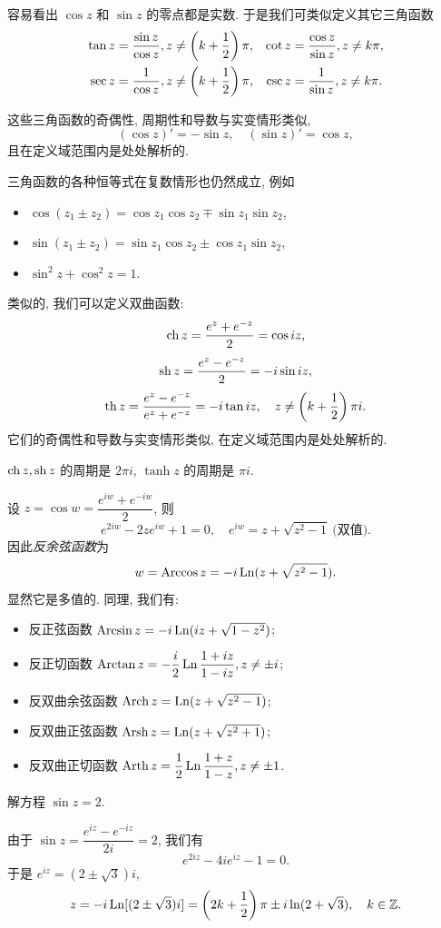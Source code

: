 \documentclass[nocolor,theme=doremi,lang=cn,11pt,chinese,twoside,openright,usesamecnt]{elegantbook}
\begin{document}
容易看出 $\cos z$ 和 $\sin z$ 的零点都是实数.
于是我们可类似定义其它三角函数
\begin{align*}
	\tan z&=\frac{\sin z}{\cos z},z\neq\left(k+\frac{1}{2}\right)\pi,&
	\cot z&=\frac{\cos z}{\sin z},z\neq k\pi,\\
	\sec z&=\frac{1}{\cos z},z\neq\left(k+\frac{1}{2}\right)\pi,&
	\csc z&=\frac{1}{\sin z},z\neq k\pi.
\end{align*}

这些三角函数的奇偶性, 周期性和导数与实变情形类似,
\[(\cos z)'=-\sin z,\quad
(\sin z)'=\cos z,\]
且在定义域范围内是处处解析的.

三角函数的各种恒等式在复数情形也仍然成立,
例如
\begin{itemize}
	\item $\cos(z_1\pm z_2)=\cos z_1 \cos z_2\mp \sin z_1 \sin z_2$,
	\item $\sin(z_1\pm z_2)=\sin z_1 \cos z_2\pm\cos z_1 \sin z_2$,
	\item $\sin^2z+\cos^2z=1$.
\end{itemize}

类似的, 我们可以定义双曲函数:
\[\operatorname{ch} z=\frac{e^z+e^{-z}}2=\cos iz,\]
\[\operatorname{sh} z=\frac{e^z-e^{-z}}2=-i\sin iz,\]
\[\operatorname{th} z=\frac{e^z-e^{-z}}{e^z+e^{-z}}
=-i\tan iz,\quad z\neq \left(k+\frac{1}{2}\right)\pi i.\]
它们的奇偶性和导数与实变情形类似, 在定义域范围内是处处解析的.

$\operatorname{ch} z,\operatorname{sh} z$ 的周期是 $2\pi i$, $\tanh z$ 的周期是 $\pi i$.

设 $z=\cos w=\dfrac{e^{iw}+e^{-iw}}2$,
则
\[e^{2iw}-2ze^{iw}+1=0,\quad
{e^{iw}=z+\sqrt{z^2-1}\ \text{(双值)}.}\]
因此\emph{反余弦函数}为
\[w=\operatorname{Arccos} z=-i\operatorname{Ln}(z+\sqrt{z^2-1}).\]
显然它是多值的.
同理, 我们有:
\begin{itemize}
	\item 反正弦函数 $\operatorname{Arcsin} z=-i\operatorname{Ln}(iz+\sqrt{1-z^2})$;
	\item 反正切函数 $\operatorname{Arctan} z=-\dfrac i2\operatorname{Ln}\dfrac{1+iz}{1-iz}, z\neq \pm i$;
	\item 反双曲余弦函数 $\operatorname{Arch} z=\operatorname{Ln}(z+\sqrt{z^2-1})$;
	\item 反双曲正弦函数 $\operatorname{Arsh} z=\operatorname{Ln}(z+\sqrt{z^2+1})$;
	\item 反双曲正切函数 $\operatorname{Arth} z=\dfrac12\operatorname{Ln}\dfrac{1+z}{1-z}, z\neq \pm1$.
\end{itemize}

\begin{example}
	解方程 $\sin z=2$.
\end{example}

\begin{solution}
由于 $\sin z=\dfrac{e^{iz}-e^{-iz}}{2i}=2$,
{我们有
\[e^{2iz}-4ie^{iz}-1=0.\]
}{于是 $e^{iz}=(2\pm\sqrt 3)i$,
}{
	\[z=-i\operatorname{Ln}[(2\pm\sqrt 3)i]=\left(2k+\frac{1}{2}\right)\pi\pm i\ln(2+\sqrt3),\quad k\in{\mathbb{Z}}.\]}
\end{solution}
\end{document}
